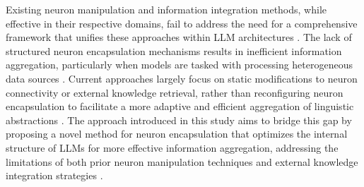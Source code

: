 Existing neuron manipulation and information integration methods, while effective in their respective domains, fail to address the need for a comprehensive framework that unifies these approaches within LLM architectures \cite{lapov2024dynamic}. The lack of structured neuron encapsulation mechanisms results in inefficient information aggregation, particularly when models are tasked with processing heterogeneous data sources \cite{beaumont2024neural}. Current approaches largely focus on static modifications to neuron connectivity or external knowledge retrieval, rather than reconfiguring neuron encapsulation to facilitate a more adaptive and efficient aggregation of linguistic abstractions \cite{lemal2024dynamic}. The approach introduced in this study aims to bridge this gap by proposing a novel method for neuron encapsulation that optimizes the internal structure of LLMs for more effective information aggregation, addressing the limitations of both prior neuron manipulation techniques and external knowledge integration strategies \cite{merrick2024upscaling}.